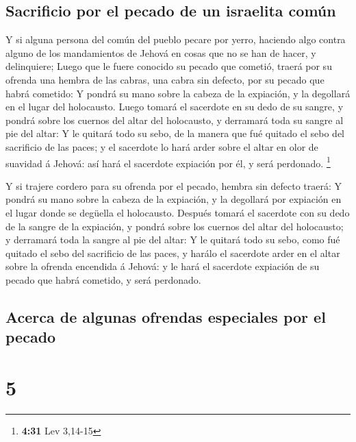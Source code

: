 \hypertarget{sacrificio-por-el-pecado-de-un-israelita-comuxfan}{%
\subsection{Sacrificio por el pecado de un israelita
común}\label{sacrificio-por-el-pecado-de-un-israelita-comuxfan}}

 Y si alguna persona del común del pueblo pecare por yerro,
haciendo algo contra alguno de los mandamientos de Jehová en cosas que
no se han de hacer, y delinquiere;  Luego que le fuere
conocido su pecado que cometió, traerá por su ofrenda una hembra de las
cabras, una cabra sin defecto, por su pecado que habrá cometido:
 Y pondrá su mano sobre la cabeza de la expiación, y la
degollará en el lugar del holocausto.  Luego tomará el
sacerdote en su dedo de su sangre, y pondrá sobre los cuernos del altar
del holocausto, y derramará toda su sangre al pie del altar:
 Y le quitará todo su sebo, de la manera que fué quitado el
sebo del sacrificio de las paces; y el sacerdote lo hará arder sobre el
altar en olor de suavidad á Jehová: así hará el sacerdote expiación por
él, y será perdonado. \footnote{\textbf{4:31} Lev 3,14-15}

 Y si trajere cordero para su ofrenda por el pecado, hembra
sin defecto traerá:  Y pondrá su mano sobre la cabeza de la
expiación, y la degollará por expiación en el lugar donde se degüella el
holocausto.  Después tomará el sacerdote con su dedo de la
sangre de la expiación, y pondrá sobre los cuernos del altar del
holocausto; y derramará toda la sangre al pie del altar:  Y
le quitará todo su sebo, como fué quitado el sebo del sacrificio de las
paces, y harálo el sacerdote arder en el altar sobre la ofrenda
encendida á Jehová: y le hará el sacerdote expiación de su pecado que
habrá cometido, y será perdonado.

\hypertarget{acerca-de-algunas-ofrendas-especiales-por-el-pecado}{%
\subsection{Acerca de algunas ofrendas especiales por el
pecado}\label{acerca-de-algunas-ofrendas-especiales-por-el-pecado}}

\hypertarget{section-4}{%
\section{5}\label{section-4}}

